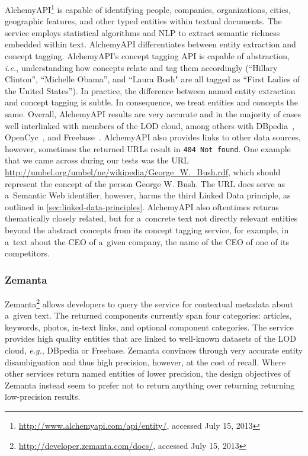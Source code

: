 AlchemyAPI\footnote{\url{http://www.alchemyapi.com/api/entity/},
accessed July 15, 2013}
is capable of identifying people, companies, organizations,
cities, geographic features, and other typed entities within
textual documents.
The service employs statistical algorithms and NLP
to extract semantic richness embedded within text.
AlchemyAPI differentiates between entity extraction and
concept tagging.
AlchemyAPI's concept tagging API is capable of abstraction, \emph{i.e.},
understanding how concepts relate and tag them accordingly
(``Hillary Clinton'', ``Michelle Obama'', and ``Laura Bush" are all
tagged as ``First Ladies of the United States'').
In practice, the difference between named entity extraction
and concept tagging is subtle.
In consequence, we treat entities and concepts the same.
Overall, AlchemyAPI results are very accurate
and in the majority of cases well interlinked
with members of the LOD cloud,
among others with DBpedia~\cite{auer2007dbpedia},
OpenCyc~\cite{lenat1995cyc},
and Freebase~\cite{markoff2007freebase}.
AlchemyAPI also provides links to other data sources, however,
sometimes the returned URLs result in \texttt{404 Not found}.
One example that we came across during our tests was the URL
\url{http://umbel.org/umbel/ne/wikipedia/George\_W.\_Bush.rdf}, which should represent the concept of the person George W. Bush.
The URL does serve as a~Semantic Web identifier, however, 
harms the third Linked Data principle,
as outlined in \autoref{sec:linked-data-principles}.
AlchemyAPI also oftentimes returns thematically closely related,
but for a~concrete text not directly relevant entities
beyond the abstract concepts from its concept tagging service,
for example, in a~text about the CEO of a~given company,
the name of the CEO of one of its competitors.

\subsubsection{Zemanta}

Zemanta\footnote{\url{http://developer.zemanta.com/docs/},
accessed July 15, 2013}
allows developers to query the service for contextual metadata
about a~given text.
The returned components currently span four categories:
articles, keywords, photos, in-text links, and
optional component categories.
The service provides high quality entities that are linked
to well-known datasets of the LOD cloud, \emph{e.g.},
DBpedia or Freebase.
Zemanta convinces through very accurate entity disambiguation
and thus high precision, however, at the cost of recall.
Where other services return named entities of lower precision,
the design objectives of Zemanta instead seem to prefer
not to return anything over returning returning low-precision results.

